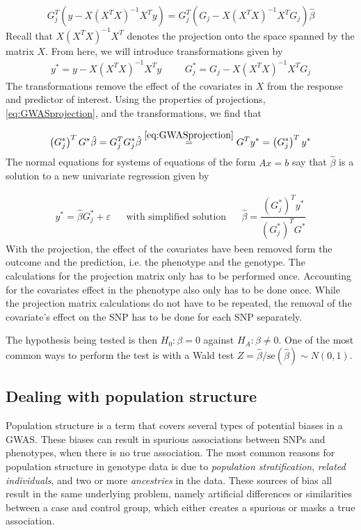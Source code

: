 \begin{equation} \label{eq:GWASprojection}
G_j^T(y - X(X^TX)^{-1}X^Ty) = G_j^T(G_j - X(X^TX)^{-1}X^TG_j) \hat{\beta}
\end{equation}
Recall that $ X(X^TX)^{-1}X^T $ denotes the projection onto the space spanned by the matrix $ X $. From here, we will introduce transformations given by 
\begin{align}
	y^\ast = y - X(X^TX)^{-1}X^Ty & & & G_j^{\ast} = G_j - X(X^TX)^{-1}X^TG_j
\end{align}
The transformations remove the effect of the covariates in $ X $ from the response and predictor of interest. Using the properties of projections, \cref{eq:GWASprojection}, and the transformations, we find that 

\begin{equation}
\left( G_j^{\ast} \right)^T G^{\ast} \hat{\beta} = G_j^T G_j^{\ast} \hat{\beta} \stackrel{\ref{eq:GWASprojection}}{=} G^T y^{\ast} = \left( G_j^{\ast} \right)^T y^{\ast}
\end{equation}
The normal equations for systems of equations of the form $ Ax=b $ say that $ \hat{\beta} $ is a solution to a new univariate regression given by

\begin{align}\label{eq:univarGWAS}
y^\ast = \hat{\beta} G_j^{\ast} + \varepsilon&   &\text{with simplified solution}&  &\hat{\beta} = \dfrac{\left( G_j^{\ast} \right)^T y^{\ast}}{\left( G_j^{\ast} \right)^T G^{\ast}}
\end{align}
With the projection, the effect of the covariates have been removed form the outcome and the prediction, i.e. the phenotype and the genotype. The calculations for the projection matrix only has to be performed once. Accounting for the covariates effect in the phenotype also only has to be done once. While the projection matrix calculations do not have to be repeated, the removal of the covariate's effect on the SNP has to be done for each SNP separately.

The hypothesis being tested is then $ H_0: \beta = 0 $ against $ H_A: \beta \neq 0 $. One of the most common ways to perform the test is with a Wald test $ Z = \hat{\beta}/\text{se}(\hat{\beta}) \sim N(0,1)$. 

\subsection{Dealing with population structure}
Population structure is a term that covers several types of potential biases in a GWAS. These biases can result in spurious associations between SNPs and phenotypes, when there is no true association. The most common reasons for population structure in genotype data is due to \textit{population stratification}, \textit{related individuals}, and two or more \textit{ancestries} in the data. These sources of bias all result in the same underlying problem, namely artificial differences or similarities between a case and control group, which either creates a spurious or masks a true association. 

